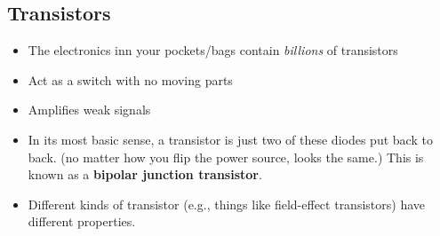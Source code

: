 \documentclass[11pt]{book}
\begin{document}
\subsection{Transistors}

\begin{itemize}
	\item The electronics inn your pockets/bags contain \textit{billions} of transistors
	\item Act as a switch with no moving parts
	\item Amplifies weak signals
	\item In its most basic sense, a transistor is just two of these diodes put back to back. (no matter how you flip the power source, looks the same.) This is known as a \textbf{bipolar junction transistor}.
	\item Different kinds of transistor (e.g., things like field-effect transistors) have different properties. 
\end{itemize}
\end{document}
